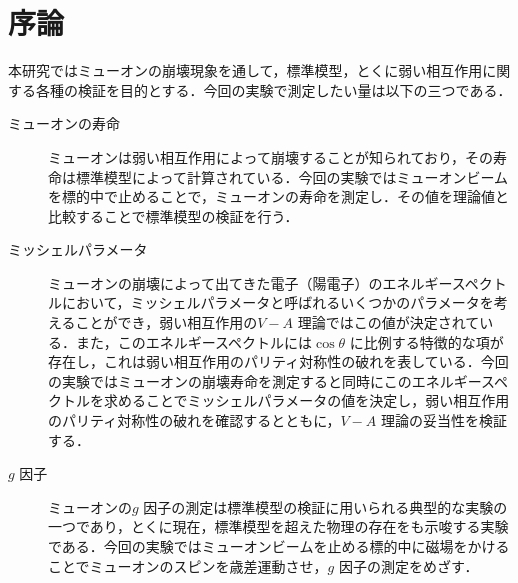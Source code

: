 





%

\section{序論}
	本研究ではミューオンの崩壊現象を通して，標準模型，とくに弱い相互作用に関する各種の検証を目的とする．今回の実験で測定したい量は以下の三つである．

	\begin{description}
	\item[ミューオンの寿命]

	ミューオンは弱い相互作用によって崩壊することが知られており，その寿命は標準模型によって計算されている．今回の実験ではミューオンビームを標的中で止めることで，ミューオンの寿命を測定し．その値を理論値と比較することで標準模型の検証を行う．

	\item[ミッシェルパラメータ]

	ミューオンの崩壊によって出てきた電子（陽電子）のエネルギースペクトルにおいて，ミッシェルパラメータと呼ばれるいくつかのパラメータを考えることができ，弱い相互作用の$V - A$ 理論ではこの値が決定されている．また，このエネルギースペクトルには$\cos \theta$ に比例する特徴的な項が存在し，これは弱い相互作用のパリティ対称性の破れを表している．今回の実験ではミューオンの崩壊寿命を測定すると同時にこのエネルギースペクトルを求めることでミッシェルパラメータの値を決定し，弱い相互作用のパリティ対称性の破れを確認するとともに，$V - A$ 理論の妥当性を検証する．

	\item[$g$ 因子]

	ミューオンの$g$ 因子の測定は標準模型の検証に用いられる典型的な実験の一つであり，とくに現在，標準模型を超えた物理の存在をも示唆する実験である．今回の実験ではミューオンビームを止める標的中に磁場をかけることでミューオンのスピンを歳差運動させ，$g$ 因子の測定をめざす．
	\end{description}

